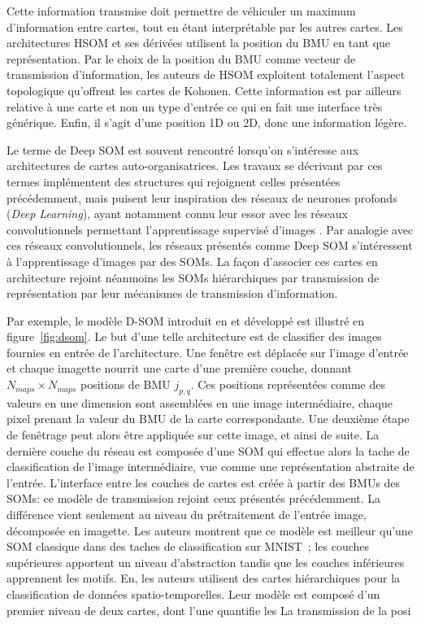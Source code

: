 \documentclass[../main]{subfiles}
\begin{document}
Cette information transmise doit permettre de véhiculer un maximum d'information entre cartes, tout en étant interprétable par les autres cartes. Les architectures HSOM et ses dérivées utilisent la position du BMU en tant que représentation.
Par le choix de la position du BMU comme vecteur de transmission d'information, les auteurs de HSOM exploitent totalement l'aspect topologique qu'offrent les cartes de Kohonen. Cette information est par ailleurs relative à une carte et non un type d'entrée ce qui en fait une interface très générique. Enfin, il s'agit d'une position 1D ou 2D, donc une information légère.

Le terme de Deep SOM est souvent rencontré lorsqu'on s'intéresse aux architectures de cartes auto-organisatrices.
Les travaux se décrivant par ces termes implémentent des structures qui rejoignent celles présentées précédemment, mais puisent leur inspiration des réseaux de neurones profonds (\emph{Deep Learning}), ayant notamment connu leur essor avec les réseaux convolutionnels permettant l'apprentissage supervisé d'images \cite{lecun_deep_2015}.
Par analogie avec ces réseaux convolutionnels, les réseaux présentés comme Deep SOM s'intéressent à l'apprentissage d'images par des SOMs. 
La façon d'associer ces cartes en architecture rejoint néanmoins les SOMs hiérarchiques par transmission de représentation par leur mécanismes de transmission d'information.

Par exemple, le modèle D-SOM introduit en \cite{Liu2015DeepSM} et développé \cite{wickramasinghe_deep_2019}  est illustré en figure~\ref{fig:dsom}.
Le but d'une telle architecture est de classifier des images fournies en entrée de l'architecture.
Une fenêtre est déplacée sur l'image d'entrée et chaque imagette nourrit une carte d'une première couche, donnant $N_{maps}  \times N_{maps}$ positions de BMU $j_{p,q}$. Ces positions représentées comme des valeurs en une dimension sont assemblées en une image intermédiaire, chaque pixel prenant la valeur du BMU de la carte correspondante. Une deuxième étape de fenêtrage peut alors être appliquée sur cette image, et ainsi de suite. La dernière couche du réseau est composée d'une SOM qui effectue alors la tache de classification de l'image intermédiaire, vue comme une représentation abstraite  de l'entrée.
L'interface entre les couches de cartes est créée à partir des BMUs des SOMs: ce modèle de transmission rejoint ceux présentés précédemment. La différence vient seulement au niveau du prétraitement de l'entrée image, décomposée en imagette.
Les auteurs montrent que ce modèle est meilleur qu'une SOM classique dans des taches de classification sur MNIST~; les couches supérieures apportent un niveau d'abstraction tandis que les couches inférieures apprennent les motifs.
En\cite{nawaratne_hierarchical_2020-1}, les auteurs utilisent des cartes hiérarchiques pour la classification de données spatio-temporelles. Leur modèle est composé d'un premier niveau de deux cartes, dont l'une quantifie les 
La transmission de la posi
\end{document}
